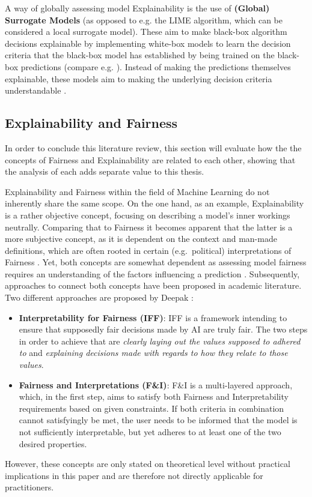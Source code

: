 A way of globally assessing model Explainability is the use of \textbf{(Global) Surrogate Models} (as opposed to e.g. the LIME algorithm, which can be considered a local surrogate model). 
These aim to make black-box algorithm decisions explainable by implementing white-box models to learn the decision criteria that the black-box model has established by being trained on the black-box predictions (compare e.g. \cite{Karim2023}).
Instead of making the predictions themselves explainable, these models aim to making the underlying decision criteria understandable \parencite{Molnar2023}.

\subsection{Explainability and Fairness}\label{subsec:Explainability_fairness}

In order to conclude this literature review, this section will evaluate how the the concepts of Fairness and Explainability are related to each other, showing that the analysis of each adds separate value to this thesis.

Explainability and Fairness within the field of Machine Learning do not inherently share the same scope. On the one hand, as an example, Explainability is a rather objective concept, focusing on describing a model's inner workings neutrally. 
Comparing that to Fairness it becomes apparent that the latter is a more subjective concept, as it is dependent on the context and man-made definitions, which are often rooted in certain (e.g.\ political) interpretations of Fairness \parencite{Deepak2021}.
Yet, both concepts are somewhat dependent as assessing model fairness requires an understanding of the factors influencing a prediction \parencite{Zhou2022}.
Subsequently, approaches to connect both concepts have been proposed in academic literature. Two different approaches are proposed by Deepak \parencite{Deepak2021}: 
\begin{itemize}
    \item \textbf{Interpretability for Fairness (IFF)}: IFF is a framework intending to ensure that supposedly fair decisions made by AI are truly fair. The two steps in order to achieve that are \textit{clearly laying out the values supposed to adhered to} and \textit{explaining decisions made with regards to how they relate to those values}.
    \item \textbf{Fairness and Interpretations (F\&I)}: F\&I is a multi-layered approach, which, in the first step, aims to satisfy both Fairness and Interpretability requirements based on given constraints. If both criteria in combination cannot satisfyingly be met, the user needs to be informed that the model is not sufficiently interpretable, but yet adheres to at least one of the two desired properties.
\end{itemize}
However, these concepts are only stated on theoretical level without practical implications in this paper and are therefore not directly applicable for practitioners.


